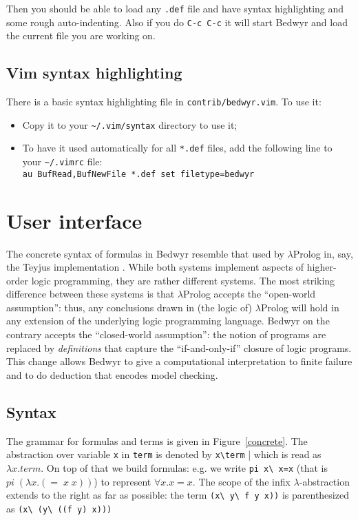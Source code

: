 \documentclass{article}
\begin{document}
Then you should be able to load any \verb:.def: file
and have syntax highlighting and some rough auto-indenting.
Also if you do \verb.C-c C-c. it will start Bedwyr
and load the current file you are working on.

\subsection{Vim syntax highlighting}

There is a basic syntax highlighting file in \verb;contrib/bedwyr.vim;.
To use it:
\begin{itemize}
\item
Copy it to your \verb|~/.vim/syntax| directory to use it;
\item
To have it used automatically for all \verb|*.def| files, add the
following line to your \verb;~/.vimrc; file:\\
\verb|au BufRead,BufNewFile *.def set filetype=bedwyr|
\end{itemize}


\section{User interface}
\label{sec:interface}

The concrete syntax of formulas in Bedwyr resemble that used by
$\lambda$Prolog in, say, the Teyjus implementation
\cite{nadathur99cade}.  While both systems implement aspects of
higher-order logic programming, they are rather different systems.
The most striking difference between these systems is that
$\lambda$Prolog accepts the ``open-world assumption'': thus, any
conclusions drawn in (the logic of) $\lambda$Prolog will hold in any
extension of the underlying logic programming language.  Bedwyr on the
contrary accepts the ``closed-world assumption'': the notion of
programs are replaced by {\em definitions} that capture the
``if-and-only-if'' closure of logic programs.  This change allows
Bedwyr to give a computational interpretation to finite failure and
to do deduction that encodes model checking.

\subsection{Syntax}

The grammar for formulas and terms is given in Figure~\ref{concrete}.
The abstraction over variable \verb.x. in \verb.term. is denoted by
\verb.x\term. | which is read as $\lambda x. term$. On top of that we
build formulas: e.g. we write \verb.pi x\ x=x.  (that is
$pi\;(\lambda{}x.(=\;x\;x))$) to represent $\forall x. x=x$.  The
scope of the infix $\lambda$-abstraction extends to the right as far
as possible: the term \verb.(x\ y\ f y x)). is parenthesized as 
\verb.(x\ (y\ ((f y) x))).
\end{document}
